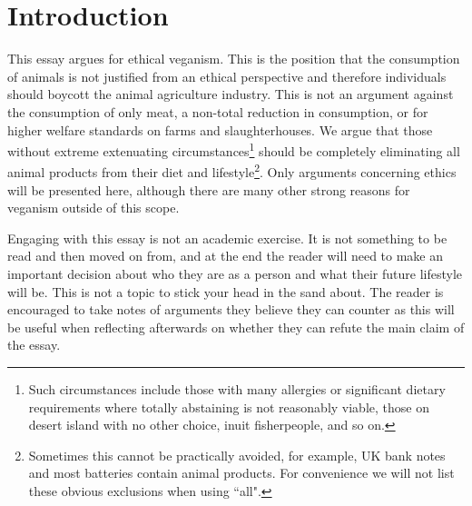 

\section{Introduction}

This essay argues for ethical veganism. This is the position that the consumption of animals is not justified from an ethical perspective and therefore individuals should boycott the animal agriculture industry. This is not an argument against the consumption of only meat, a non-total reduction in consumption, or for higher welfare standards on farms and slaughterhouses. We argue that those without extreme extenuating circumstances\footnote{Such circumstances include those with many allergies or significant dietary requirements where totally abstaining is not reasonably viable, those on desert island with no other choice, inuit fisherpeople, and so on.} should be completely eliminating all animal products from their diet and lifestyle\footnote{Sometimes this cannot be practically avoided, for example, UK bank notes and most batteries contain animal products. For convenience we will not list these obvious exclusions when using ``all".}. Only arguments concerning ethics will be presented here, although there are many other strong reasons for veganism outside of this scope.

Engaging with this essay is not an academic exercise. It is not something to be read and then moved on from, and at the end the reader will need to make an important decision about who they are as a person and what their future lifestyle will be. This is not a topic to stick your head in the sand about. The reader is encouraged to take notes of arguments they believe they can counter as this will be useful when reflecting afterwards on whether they can refute the main claim of the essay.

